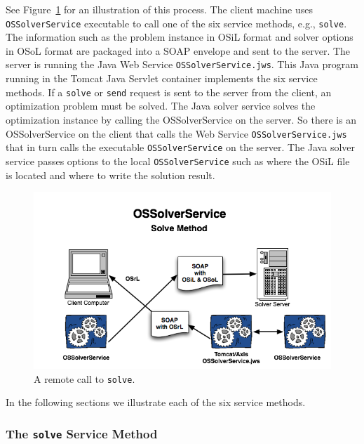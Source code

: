 \documentclass[11pt]{article}
\newcommand{\figurepath}{./figures}
\newcounter{Fig}
\renewcommand{\_}{{\char"5F}}
\renewcommand{\{}{{\char"7B}}
\renewcommand{\}}{{\char"7D}}
\renewcommand{\^}{{\char"0D}}
\renewcommand{\'}{{\char"0D}}
\begin{document}
\begin{enumerate}[Step 1:]
See Figure~\ref{figure:ossolverservice} for an illustration of this process.
The client machine uses {\tt OSSolverService} executable to call one of the
six service methods, e.g., {\tt solve}. The  information such as the problem
instance in OSiL format and solver options in OSoL format are packaged into
a SOAP envelope and sent to the server. The server is running the Java Web
Service {\tt OSSolverService.jws}. This Java program running in the Tomcat
Java Servlet container implements the six service methods. If a {\tt solve}
or {\tt send} request is sent to the server from the client, an optimization
problem must be solved. The Java solver service solves the optimization instance
by  calling the  OSSolverService on the server. So there is an OSSolverService
on the client that calls the Web Service {\tt  OSSolverService.jws} that in turn
calls  the executable {\tt OSSolverService} on the server.
The Java solver service passes options to the local {\tt OSSolverService}
such as where the OSiL file is located and where to write the solution result.

\begin{figure}
\centering
\includegraphics[scale=0.5]{./figures/OSSolverService.png}
\caption{A remote call to {\tt solve}.}
\label{figure:ossolverservice}
\end{figure}


In the following sections we illustrate each of the six service methods.

\subsubsection{The  {\tt solve} Service Method}\label{section:solve}


\end{enumerate}
\end{document}
